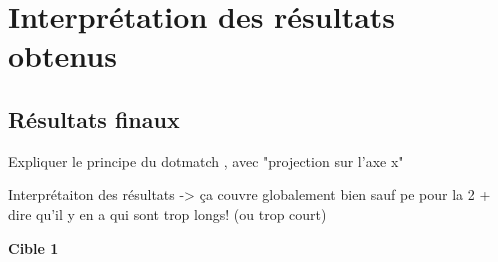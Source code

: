 
\section{Interprétation des résultats obtenus}

\subsection{Résultats finaux}

Expliquer le principe du dotmatch , avec "projection sur l'axe x"

Interprétaiton des résultats -> ça couvre globalement bien sauf pe pour la 2 + dire qu'il y en a qui sont trop longs! (ou trop court)

\noindent\textbf{Cible 1}





